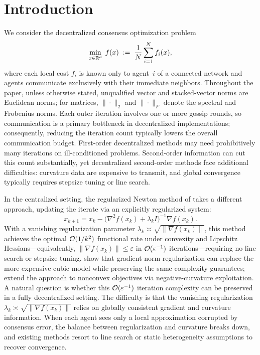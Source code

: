 \documentclass[review,onefignum,onetabnum]{siamart171218}
\begin{document}
	\section{Introduction}\label{sec:intro}
	We consider the decentralized consensus optimization problem
	\begin{equation}\label{eq:intro_prob}
		\min_{x\in\mathbb{R}^d}\; f(x)\;:=\;\frac{1}{N}\sum_{i=1}^N f_i(x),
	\end{equation}
	where each local cost $f_i$ is known only to agent~$i$ of a
	connected network and agents communicate exclusively with their
	immediate neighbors.
	Throughout the paper, unless otherwise stated, unqualified vector and
	stacked-vector norms are Euclidean norms; for matrices, $\|\cdot\|_2$
	and $\|\cdot\|_F$ denote the spectral and Frobenius norms.
	Each outer iteration involves one or more gossip rounds, so communication is a primary bottleneck in decentralized implementations; consequently, reducing the iteration count typically lowers the overall communication budget.
	First-order decentralized methods may need prohibitively many
	iterations on ill-conditioned problems.
	Second-order information can cut this count substantially, yet
	decentralized second-order methods face additional difficulties:
	curvature data are expensive to transmit, and global convergence
	typically requires stepsize tuning or line search.
	
	In the centralized setting, the regularized Newton method of
	\citet{mishchenko2023rn} takes a different approach, updating
	the iterate via an explicitly regularized system:
	\[
	x_{k+1} = x_k - \bigl(\nabla^2 f(x_k) + \lambda_k I\bigr)^{-1} \nabla f(x_k).
	\]
	With a vanishing regularization parameter
	$\lambda_k\asymp\sqrt{\|\nabla f(x_k)\|}$, this method achieves
	the optimal $\mathcal{O}(1/k^2)$ functional rate under convexity
	and Lipschitz Hessians---equivalently,
	$\|\nabla f(x_k)\|\le\varepsilon$ in $\mathcal{O}(\varepsilon^{-1})$
	iterations---requiring no line search or stepsize tuning.
	\citet{doikov2024gradient} show that gradient-norm regularization
	can replace the more expensive cubic model
	\citep{nesterov2006cubic,cartis2011arc} while preserving the
	same complexity guarantees;
	\citet{gratton2023nonconvex} extend the approach to nonconvex
	objectives via negative-curvature exploitation.
	A natural question is whether this $\mathcal{O}(\varepsilon^{-1})$ iteration complexity can be preserved in a fully decentralized setting.
	The difficulty is that the vanishing regularization
	$\lambda_k\asymp\sqrt{\|\nabla f(x_k)\|}$ relies on globally
	consistent gradient and curvature information.
	When each agent sees only a local approximation corrupted
	by consensus error, the balance between regularization and curvature
	breaks down, and existing methods resort to line search or static
	heterogeneity assumptions to recover convergence.
	
\end{document}

